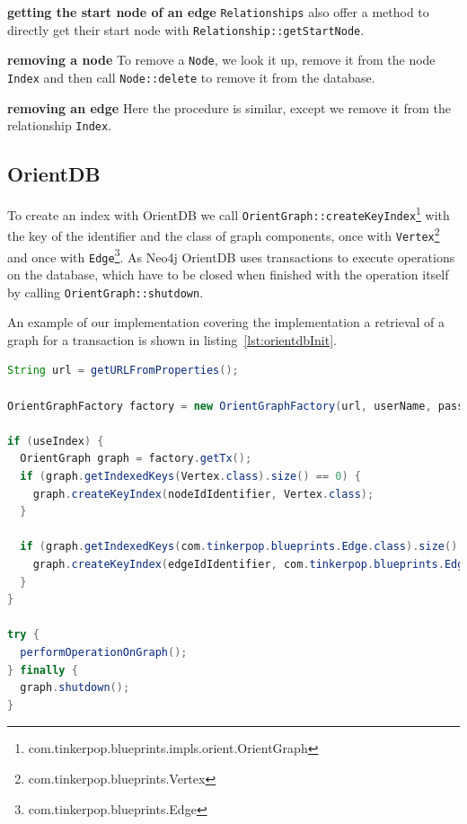 \textbf{getting the start node of an edge} \newline
\texttt{Relationships} also offer a method to directly get their start node with \texttt{Relationship::getStartNode}.

\textbf{removing a node} \newline
To remove a \texttt{Node},
we look it up,
remove it from the node \texttt{Index} and then call \texttt{Node::delete} to remove it from the database.

\textbf{removing an edge} \newline
Here the procedure is similar,
except we remove it from the relationship \texttt{Index}.

\subsection{OrientDB}
To create an index with OrientDB we call \texttt{OrientGraph::createKeyIndex}\footnote{com.tinkerpop.blueprints.impls.orient.OrientGraph} with the key of the identifier and the class of graph components,
once with \texttt{Vertex}\footnote{com.tinkerpop.blueprints.Vertex} and once with \texttt{Edge}\footnote{com.tinkerpop.blueprints.Edge}.
As Neo4j OrientDB uses transactions to execute operations on the database,
which have to be closed when finished with the operation itself by calling \texttt{OrientGraph::shutdown}.

An example of our implementation covering the implementation a retrieval of a graph for a transaction is shown in listing~\ref{lst:orientdbInit}.

\begin{lstlisting}[language=Java,label={lst:orientdbInit},caption={Implementation of the initialisation and the retrieval of a graph for a transaction.},captionpos=b]
String url = getURLFromProperties();

OrientGraphFactory factory = new OrientGraphFactory(url, userName, password);

if (useIndex) {
  OrientGraph graph = factory.getTx();
  if (graph.getIndexedKeys(Vertex.class).size() == 0) {
    graph.createKeyIndex(nodeIdIdentifier, Vertex.class);
  }

  if (graph.getIndexedKeys(com.tinkerpop.blueprints.Edge.class).size() == 0) {
    graph.createKeyIndex(edgeIdIdentifier, com.tinkerpop.blueprints.Edge.class);
  }
}

try {
  performOperationOnGraph();
} finally {
  graph.shutdown();
}
\end{lstlisting}


